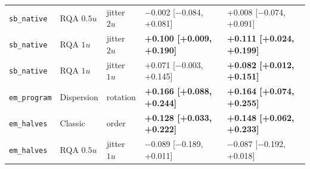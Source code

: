 \begin{tabular}{lllll}
\texttt{sb\_native} & RQA $0.5u$ & jitter $2u$ & $-$0.002 [$-$0.084, +0.081] & +0.008 [$-$0.074, +0.091] \\
\texttt{sb\_native} & RQA $1u$ & jitter $2u$ & \textbf{+0.100 [+0.009, +0.190]} & \textbf{+0.111 [+0.024, +0.199]} \\
\texttt{sb\_native} & RQA $1u$ & jitter $1u$ & +0.071 [$-$0.003, +0.145] & \textbf{+0.082 [+0.012, +0.151]} \\
\texttt{em\_program} & Dispersion & rotation & \textbf{+0.166 [+0.088, +0.244]} & \textbf{+0.164 [+0.074, +0.255]} \\
\texttt{em\_halves} & Classic & order & \textbf{+0.128 [+0.033, +0.222]} & \textbf{+0.148 [+0.062, +0.233]} \\
\texttt{em\_halves} & RQA $0.5u$ & jitter $1u$ & $-$0.089 [$-$0.189, +0.011] & $-$0.087 [$-$0.192, +0.018] \\
\bottomrule
\end{tabular}
